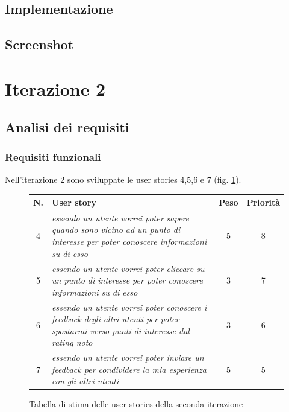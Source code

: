 \subsection{Implementazione}

\subsection{Screenshot}





\clearpage

\section{Iterazione 2}

\subsection{Analisi dei requisiti}

\subsubsection{Requisiti funzionali}
Nell'iterazione 2 sono sviluppate le user stories 4,5,6 e 7 (fig. \ref{userstoriestablesecondaiterazione}). 
\begin{figure}
\begin{center}
\begin{tabular}[c]{|c|p{7cm}|c|c|}
\hline
N. & User story & Peso & Priorità\\
\hline
4 & \textit{essendo un utente vorrei poter sapere quando sono vicino ad un punto di interesse per poter conoscere informazioni su di esso} & 5 & 8\\
\hline
5 & \textit{essendo un utente vorrei poter cliccare su un punto di interesse per poter conoscere informazioni su di esso} & 3 & 7\\
\hline
6 & \textit{essendo un utente vorrei poter conoscere i feedback degli altri utenti per poter spostarmi verso punti di interesse dal rating noto} & 3 & 6\\
\hline
7 & \textit{essendo un utente vorrei poter inviare un feedback per condividere la mia esperienza con gli altri utenti} & 5 & 5\\
\hline
\end{tabular}
\caption{Tabella di stima delle user stories della seconda iterazione\label{userstoriestablesecondaiterazione}}
\end{center}
\end{figure}
\clearpage

